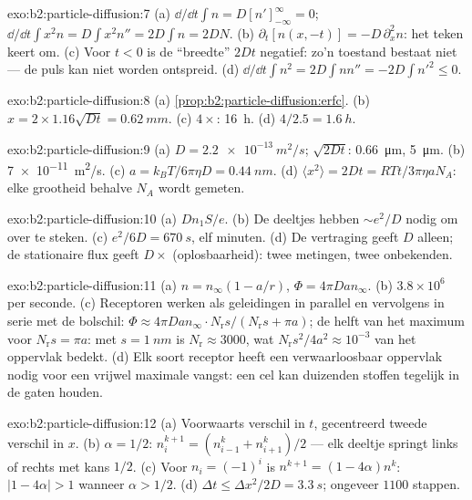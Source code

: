 \begin{solution}{exo:b2:particle-diffusion:7}
(a) $\dd/\dd t\int n = D[n']_{-\infty}^{\infty} = 0$;
$\dd/\dd t\int x^2 n = D\int
x^2 n'' = 2D\int n = 2DN$. (b)
$\partial_t[n(x,-t)] = -D\,\partial_x^2 n$: het
teken keert om. (c) Voor $t < 0$ is de ``breedte'' $2Dt$ negatief: zo'n
toestand bestaat niet --- de puls kan niet worden ontspreid. (d)
$\dd/\dd t\int n^2 = 2D\int nn''
= -2D\int n'^2 \le 0$.
\end{solution}

\begin{solution}{exo:b2:particle-diffusion:8}
(a) \cref{prop:b2:particle-diffusion:erfc}. (b)
$x = 2 \times 1.16\sqrt{Dt}
= \qty{0.62}{mm}$. (c) $4\times$: \qty{16}{h}.
(d) $4/2.5 = \qty{1.6}{h}$.
\end{solution}

\begin{solution}{exo:b2:particle-diffusion:9}
(a) $D = \qty{2.2e-13}{m^2/s}$; $\sqrt{2Dt}$: \qty{0.66}{\micro m},
\qty{5}{\micro m}. (b) \qty{7e-11}{m^2/s}. (c)
$a = k_BT/6\pi\eta D =
\qty{0.44}{nm}$. (d)
$\langle x^2\rangle = 2Dt = RTt/3\pi\eta a N_A$: elke
grootheid behalve $N_A$ wordt gemeten.
\end{solution}

\begin{solution}{exo:b2:particle-diffusion:10}
(a) $Dn_1S/e$. (b) De deeltjes hebben $\sim e^2/D$ nodig om over te steken. (c)
$e^2/6D = \qty{670}{s}$, elf minuten. (d) De vertraging geeft $D$ alleen;
de stationaire flux geeft $D \times$ (oplosbaarheid): twee metingen,
twee onbekenden.
\end{solution}

\begin{solution}{exo:b2:particle-diffusion:11}
(a) $n = n_\infty(1 - a/r)$, $\Phi = 4\pi D a n_\infty$. (b)
$3.8 \times
10^6$ per seconde. (c) Receptoren werken als geleidingen in
parallel en
vervolgens in serie met de bolschil:
$\Phi \approx 4\pi Dan_\infty
\cdot N_{\text{r}}s/(N_{\text{r}}s + \pi a)$;
de helft van het maximum voor
$N_{\text{r}}s = \pi a$: met $s = \qty{1}{nm}$ is
$N_{\text{r}} \approx
3000$, wat $N_{\text{r}}s^2/4a^2 \approx 10^{-3}$ van
het oppervlak bedekt.
(d) Elk soort receptor heeft een verwaarloosbaar oppervlak nodig voor een
vrijwel maximale
vangst: een cel kan duizenden stoffen tegelijk in de gaten houden.
\end{solution}

\begin{solution}{exo:b2:particle-diffusion:12}
(a) Voorwaarts verschil in $t$, gecentreerd tweede verschil in $x$. (b)
$\alpha = 1/2$: $n_i^{k+1} = (n_{i-1}^k + n_{i+1}^k)/2$ --- elk deeltje springt
links of rechts met kans $1/2$. (c) Voor $n_i = (-1)^i$ is
$n^{k+1} =
(1 - 4\alpha)n^k$: $|1 - 4\alpha| > 1$ wanneer $\alpha > 1/2$.
(d) $\Delta t \le
\Delta x^2/2D = \qty{3.3}{s}$; ongeveer $1100$ stappen.
\end{solution}

